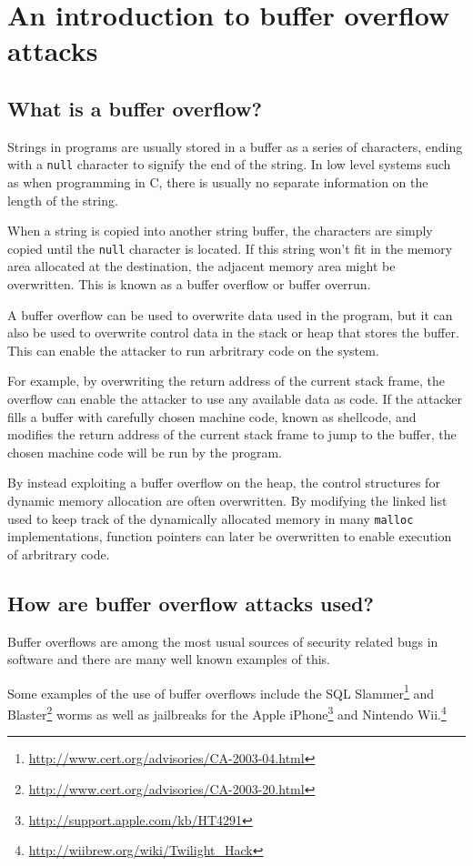 \section{An introduction to buffer overflow attacks}
\subsection{What is a buffer overflow?}
Strings in programs are usually stored in a buffer as a series of characters,
ending with a \texttt{null} character to signify the end of the string.
In low level systems such as when programming in C,
there is usually no separate information on the length of the string.

When a string is copied into another string buffer,
the characters are simply copied until
the \texttt{null} character is located.
If this string won't fit in the memory area allocated at the destination,
the adjacent memory area might be overwritten.
This is known as a buffer overflow or buffer overrun.

A buffer overflow can be used to overwrite data used in the program,
but it can also be used to overwrite control data in the stack or heap
that stores the buffer.
This can enable the attacker to run arbritrary code on the system.

For example, by overwriting the return address of the current stack frame,
the overflow can enable the attacker to use any available data as code.
If the attacker fills a buffer with carefully chosen machine code,
known as shellcode,
and modifies the return address of the current stack frame
to jump to the buffer,
the chosen machine code will be run by the program.

By instead exploiting a buffer overflow on the heap,
the control structures for dynamic memory allocation are often overwritten.
By modifying the linked list used to keep track of
the dynamically allocated memory in many \texttt{malloc} implementations,
function pointers can later be overwritten to enable
execution of arbritrary code.

\subsection{How are buffer overflow attacks used?}
Buffer overflows are among the most usual sources of
security related bugs in software and
there are many well known examples of this.

Some examples of the use of buffer overflows include the
SQL Slammer\footnote{\url{http://www.cert.org/advisories/CA-2003-04.html}}
and Blaster\footnote{\url{http://www.cert.org/advisories/CA-2003-20.html}}
worms as well as jailbreaks
for the Apple iPhone\footnote{\url{http://support.apple.com/kb/HT4291}}
and Nintendo Wii.\footnote{\url{http://wiibrew.org/wiki/Twilight\_Hack}}

